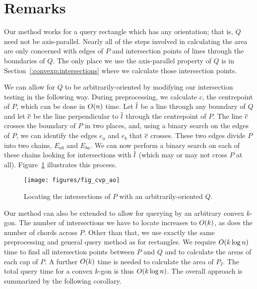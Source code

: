 \section{Remarks}
\label{:convexp:remarks}

Our method works for a query rectangle which has any orientation; that is, $Q$ need not be axis-parallel.
Nearly all of the steps involved in calculating the area are only concerned with edges of $P$ and intersection points of lines through the boundaries of $Q$.
The only place we use the axis-parallel property of $Q$ is in Section~\ref{:convexp:intersections} where we calculate those intersection points.

We can allow for $Q$ to be arbitrarily-oriented by modifying our intersection testing in the following way. 
During preprocessing, we calculate $c$, the centrepoint of $P$, which can be done in $O\!\left(n\right)$ time.
Let $\overline{l}$ be a line through any boundary of $Q$ and let $\overline{c}$ be the line perpendicular to $\overline{l}$ through the centrepoint of $P$.
The line $\overline{c}$ crosses the boundary of $P$ in two places, and, using a binary search on the edges of $P$, we can identify the edges $e_a$ and $e_b$ that $\overline{c}$ crosses.
These two edges divide $P$ into two chains, $E_{ab}$ and $E_{ba}$.
We can now perform a binary search on each of these chains looking for intersections with $\overline{l}$ (which may or may not cross $P$ at all).
Figure~\ref{fig:convexp:ao} illustrates this process.

\begin{figure}[t]
\begin{center}
  \texttt{[image: figures/fig\_cvp\_ao]}
  \caption{Locating the intersections of $P$ with an arbitrarily-oriented $Q$.}
  \label{fig:convexp:ao}
\end{center}
\end{figure}

Our method can also be extended to allow for querying by an arbitrary convex $k$-gon.
The number of intersections we have to locate increases to $O\!\left(k\right)$, as does the number of chords across $P$.
Other than that, we use exactly the same preprocessing and general query method as for rectangles. 
We require $O\!\left(k \log{n}\right)$ time to find all intersection points between $P$ and $Q$ and to calculate the areas of each cap of $P$. A further $O\!\left(k\right)$ time is needed to calculate the area of $P_I$. 
The total query time for a convex $k$-gon is thus $O\!\left(k \log{n}\right)$.
The overall approach is summarized by the following corollary.

